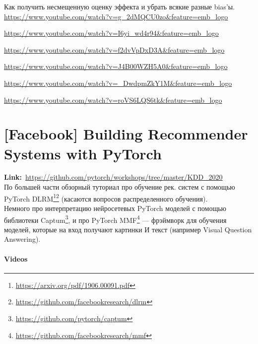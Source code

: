 Как получить несмещенную оценку эффекта и убрать всякие разные bias'ы. \\

\url{https://www.youtube.com/watch?v=g_2dMQCU0zo&feature=emb_logo}

\url{https://www.youtube.com/watch?v=I6yi_wd4r94&feature=emb_logo}

\url{https://www.youtube.com/watch?v=f2dvVpDxD3A&feature=emb_logo}

\url{https://www.youtube.com/watch?v=J4B00WZH5A0&feature=emb_logo}

\url{https://www.youtube.com/watch?v=_DwdpmZkY1M&feature=emb_logo}

\url{https://www.youtube.com/watch?v=roVS6LQS6tk&feature=emb_logo}


\newpage
\section*{[Facebook] Building Recommender Systems with PyTorch} 

\textbf{Link:}~\url{https://github.com/pytorch/workshops/tree/master/KDD_2020} \\

По большей части обзорный туториал про обучение рек. систем с помощью PyTorch DLRM\footnote{\url{https://arxiv.org/pdf/1906.00091.pdf}}\footnote{\url{https://github.com/facebookresearch/dlrm}} (касаются вопросов распределенного обучения). \\

Немного про интерпретацию нейросетевых PyTorch моделей с помощью библиотеки Captum\footnote{\url{https://github.com/pytorch/captum}}, и про PyTorch MMF\footnote{\url{https://github.com/facebookresearch/mmf}} --- фрэймворк для обучения моделей, которые на вход получают картинки И текст (например Visual Question Answering).  

\paragraph{Videos}

